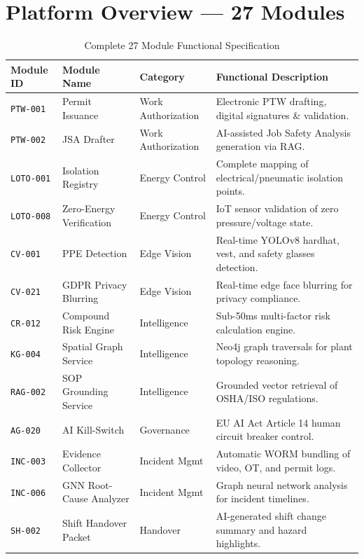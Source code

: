\documentclass[11pt,a4paper]{article}
\begin{document}
\section{Platform Overview — 27 Modules}
\begin{table}[htbp]
\centering
\caption{Complete 27 Module Functional Specification}
\begin{tabularx}{\textwidth}{
>{\ttfamily\raggedright\arraybackslash}p{}
>{\raggedright\arraybackslash}p{}
>{\raggedright\arraybackslash}p{}
>{\raggedright\arraybackslash}X
}
\toprule
\textbf{Module ID} & \textbf{Module Name} & \textbf{Category} & \textbf{Functional Description} \\
\midrule
\texttt{PTW-001} & Permit Issuance & Work Authorization & Electronic PTW drafting, digital signatures \& validation. \\
\texttt{PTW-002} & JSA Drafter & Work Authorization & AI-assisted Job Safety Analysis generation via RAG. \\
\texttt{LOTO-001} & Isolation Registry & Energy Control & Complete mapping of electrical/pneumatic isolation points. \\
\texttt{LOTO-008} & Zero-Energy Verification & Energy Control & IoT sensor validation of zero pressure/voltage state. \\
\texttt{CV-001} & PPE Detection & Edge Vision & Real-time YOLOv8 hardhat, vest, and safety glasses detection. \\
\texttt{CV-021} & GDPR Privacy Blurring & Edge Vision & Real-time edge face blurring for privacy compliance. \\
\texttt{CR-012} & Compound Risk Engine & Intelligence & Sub-50ms multi-factor risk calculation engine. \\
\texttt{KG-004} & Spatial Graph Service & Intelligence & Neo4j graph traversals for plant topology reasoning. \\
\texttt{RAG-002} & SOP Grounding Service & Intelligence & Grounded vector retrieval of OSHA/ISO regulations. \\
\texttt{AG-020} & AI Kill-Switch & Governance & EU AI Act Article 14 human circuit breaker control. \\
\texttt{INC-003} & Evidence Collector & Incident Mgmt & Automatic WORM bundling of video, OT, and permit logs. \\
\texttt{INC-006} & GNN Root-Cause Analyzer & Incident Mgmt & Graph neural network analysis for incident timelines. \\
\texttt{SH-002} & Shift Handover Packet & Handover & AI-generated shift change summary and hazard highlights. \\

\end{tabularx}
\end{table}
\end{document}
